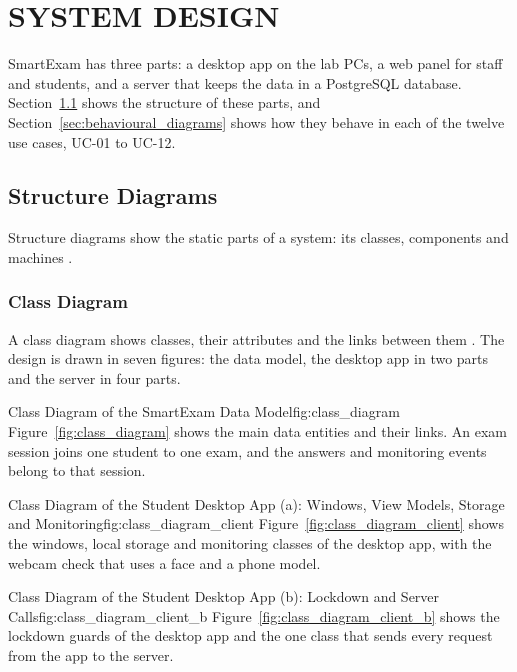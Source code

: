 \chapter{SYSTEM DESIGN}
\label{chap:system_design}

SmartExam has three parts: a desktop app on the lab PCs, a web panel for staff and students, and a server that keeps the data in a PostgreSQL database. Section~\ref{sec:structure_diagrams} shows the structure of these parts, and Section~\ref{sec:behavioural_diagrams} shows how they behave in each of the twelve use cases, UC-01 to UC-12.

\section{Structure Diagrams}
\label{sec:structure_diagrams}
Structure diagrams show the static parts of a system: its classes, components and machines \cite[Annex~A]{omg_uml251}.

\subsection{Class Diagram}
A class diagram shows classes, their attributes and the links between them \cite{class_diagram_uml, class_diagram_sparx}. The design is drawn in seven figures: the data model, the desktop app in two parts and the server in four parts.

%
{Class Diagram of the SmartExam Data Model}{fig:class_diagram}%
{Figure~\ref{fig:class_diagram} shows the main data entities and their links. An exam session joins one student to one exam, and the answers and monitoring events belong to that session.}

%
{Class Diagram of the Student Desktop App (a): Windows, View Models, Storage and Monitoring}{fig:class_diagram_client}%
{Figure~\ref{fig:class_diagram_client} shows the windows, local storage and monitoring classes of the desktop app, with the webcam check that uses a face \cite{yunet} and a phone \cite{yolox} model.}

%
{Class Diagram of the Student Desktop App (b): Lockdown and Server Calls}{fig:class_diagram_client_b}%
{Figure~\ref{fig:class_diagram_client_b} shows the lockdown guards of the desktop app and the one class that sends every request from the app to the server.}


